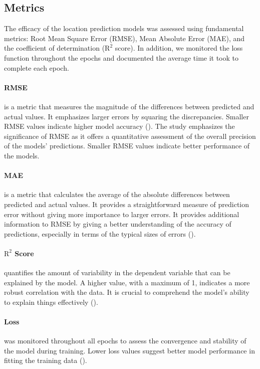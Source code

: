 \documentclass[journal,onecolumn]{IEEEtran}
\begin{document}
{\subsection{Metrics}
The efficacy of the location prediction models was assessed using fundamental metrics: Root Mean Square Error (RMSE), Mean Absolute Error (MAE), and the coefficient of determination ($\text{R}^2$ score). In addition, we monitored the loss function throughout the epochs and documented the average time it took to complete each epoch.

\paragraph{RMSE}
is a metric that measures the magnitude of the differences between predicted and actual values. It emphasizes larger errors by squaring the discrepancies. Smaller RMSE values indicate higher model accuracy (\cite{cr05willmott}). The study emphasizes the significance of RMSE as it offers a quantitative assessment of the overall precision of the models' predictions. Smaller RMSE values indicate better performance of the models.

\paragraph{MAE}
is a metric that calculates the average of the absolute differences between predicted and actual values. It provides a straightforward measure of prediction error without giving more importance to larger errors. It provides additional information to RMSE by giving a better understanding of the accuracy of predictions, especially in terms of the typical sizes of errors (\cite{cr05willmott}).

\paragraph{$\text{R}^2$ Score}
quantifies the amount of variability in the dependent variable that can be explained by the model. A higher value, with a maximum of 1, indicates a more robust correlation with the data. It is crucial to comprehend the model's ability to explain things effectively (\cite{biomet91nagelkerke}).

\paragraph{Loss}
was monitored throughout all epochs to assess the convergence and stability of the model during training. Lower loss values suggest better model performance in fitting the training data (\cite{mit16goodfellow}).

}
\end{document}
